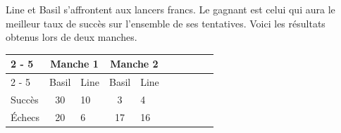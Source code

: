 \documentclass[11pt,a4paper]{article}  %
\begin{document}
Line et Basil s'affrontent aux lancers francs.
Le gagnant est celui qui aura le meilleur taux de succès sur l'ensemble de ses tentatives. Voici les résultats obtenus lors de deux manches.

\begin{tabular}{|Xc|Xc|Xc|Xc|Xc|}
	\cline { 2 - 5 }
	\multicolumn{1}{l|}{ } & \multicolumn{2}{c}{ Manche 1 } & \multicolumn{2}{c}{ Manche 2 }  \\
	\cline { 2 - 5 } \multicolumn{1}{l|}{ }  & Basil & Line & Basil & Line \\
	\hline Succès & 30 & 10 & 3 & 4 \\
	\hline Échecs & 20 & 6 & 17 & 16 \\
	\hline
\end{tabular}\\
\end{document}

